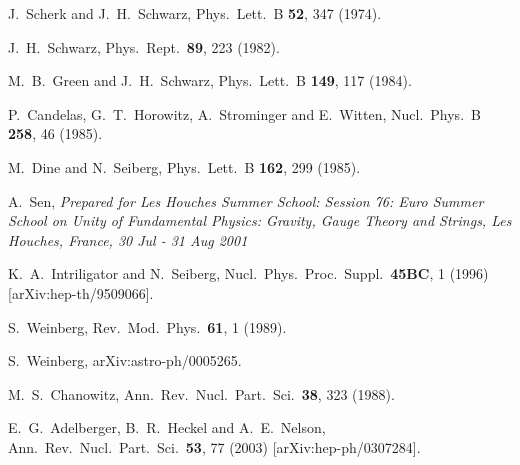 \documentclass[aps,amsfonts]{ar2e}
\begin{document}
\begin{thebibliography}{999}

  J.~Scherk and J.~H.~Schwarz,
  Phys.\ Lett.\ B {\bf 52}, 347 (1974).

  J.~H.~Schwarz,
  Phys.\ Rept.\  {\bf 89}, 223 (1982).

  M.~B.~Green and J.~H.~Schwarz,
  Phys.\ Lett.\ B {\bf 149}, 117 (1984).

  P.~Candelas, G.~T.~Horowitz, A.~Strominger and E.~Witten,
  Nucl.\ Phys.\ B {\bf 258}, 46 (1985).

  M.~Dine and N.~Seiberg,
  Phys.\ Lett.\ B {\bf 162}, 299 (1985).

  A.~Sen,
{\it Prepared for Les Houches Summer School: Session 76: Euro Summer
School on Unity of Fundamental Physics: Gravity, Gauge Theory and
Strings, Les Houches, France, 30 Jul - 31 Aug 2001}

  K.~A.~Intriligator and N.~Seiberg,
  Nucl.\ Phys.\ Proc.\ Suppl.\  {\bf 45BC}, 1 (1996)
  [arXiv:hep-th/9509066].

  S.~Weinberg,
  Rev.\ Mod.\ Phys.\  {\bf 61}, 1 (1989).

  S.~Weinberg,
  arXiv:astro-ph/0005265.

  M.~S.~Chanowitz,
  Ann.\ Rev.\ Nucl.\ Part.\ Sci.\  {\bf 38}, 323 (1988).

  E.~G.~Adelberger, B.~R.~Heckel and A.~E.~Nelson,
  Ann.\ Rev.\ Nucl.\ Part.\ Sci.\  {\bf 53}, 77 (2003)
  [arXiv:hep-ph/0307284].


\end{thebibliography}
\end{document}

